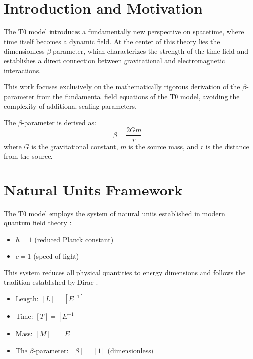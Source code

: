 \hfuzz=200pt

	\section{Introduction and Motivation}
	\label{sec:introduction}
	
	The T0 model introduces a fundamentally new perspective on spacetime, where time itself becomes a dynamic field. At the center of this theory lies the dimensionless $\beta$-parameter, which characterizes the strength of the time field and establishes a direct connection between gravitational and electromagnetic interactions.
	
	This work focuses exclusively on the mathematically rigorous derivation of the $\beta$-parameter from the fundamental field equations of the T0 model, avoiding the complexity of additional scaling parameters.
	
	\begin{tcolorbox}[colback=blue!5!white,colframe=blue!75!black,title=Central Result]
		The $\beta$-parameter is derived as:
		\begin{equation}
			\boxed{\beta = \frac{2Gm}{r}}
		\end{equation}
		where $G$ is the gravitational constant, $m$ is the source mass, and $r$ is the distance from the source.
	\end{tcolorbox}
	
	\section{Natural Units Framework}
	\label{sec:natural_units}
	
	The T0 model employs the system of natural units established in modern quantum field theory \citep{peskin1995,weinberg1995}:
	
	\begin{itemize}
		\item $\hbar = 1$ (reduced Planck constant)
		\item $c = 1$ (speed of light)
	\end{itemize}
	
	This system reduces all physical quantities to energy dimensions and follows the tradition established by Dirac \citep{dirac1958}.
	
	\begin{tcolorbox}[colback=blue!5!white,colframe=blue!75!black,title=Dimensions in Natural Units]
		\begin{itemize}
			\item Length: $[L] = [E^{-1}]$
			\item Time: $[T] = [E^{-1}]$ 
			\item Mass: $[M] = [E]$
			\item The $\beta$-parameter: $[\beta] = [1]$ (dimensionless)
		\end{itemize}
	\end{tcolorbox}
	
